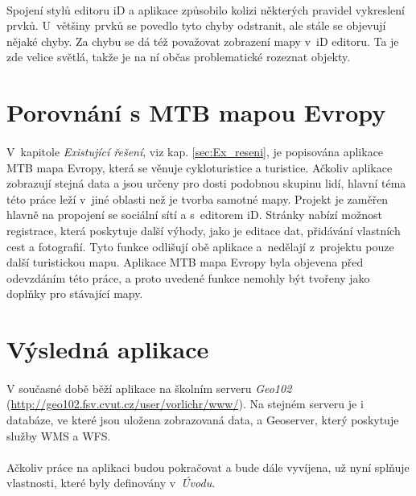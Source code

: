 \documentclass[11pt,a4paper,titlepage,oneside]{book}
\begin{document}
			\paragraph{} Spojení stylů editoru iD a aplikace způsobilo kolizi některých pravidel vykreslení prvků. U~většiny prvků se povedlo tyto chyby odstranit, ale stále se objevují nějaké chyby. Za chybu se dá též považovat zobrazení mapy v~iD editoru. Ta je zde velice světlá, takže je na ní občas problematické rozeznat objekty.


		\section{Porovnání s MTB mapou Evropy}



			\paragraph{} V~kapitole \textit{Existující řešení}, viz kap. \ref{sec:Ex_reseni}, je popisována aplikace MTB mapa Evropy, která se věnuje cykloturistice a turistice. Ačkoliv aplikace zobrazují stejná data a jsou určeny pro dosti podobnou skupinu lidí, hlavní téma této práce leží v~jiné oblasti než je tvorba samotné mapy. Projekt  je zaměřen hlavně na propojení se sociální sítí a s~editorem iD. Stránky  nabízí možnost registrace, která poskytuje další výhody, jako je editace dat, přidávání vlastních cest a fotografií. Tyto funkce odlišují obě aplikace a~nedělají z~projektu  pouze další turistickou mapu. Aplikace MTB mapa Evropy byla objevena před odevzdáním této práce, a proto uvedené funkce nemohly být tvořeny jako doplňky pro stávající mapy.

		\section{Výsledná aplikace}
			\paragraph{} V současné době běží aplikace na školním serveru \textit{Geo102} (\url{http://geo102.fsv.cvut.cz/user/vorlichr/www/}). Na stejném serveru je i databáze, ve které jsou uložena zobrazovaná data, a Geoserver, který poskytuje služby \ac{WMS} a \ac{WFS}. 
			\paragraph{} Ačkoliv práce na aplikaci budou pokračovat a bude dále vyvíjena, už nyní splňuje vlastnosti, které byly definovány v~\textit{Úvodu}. 
\end{document}
